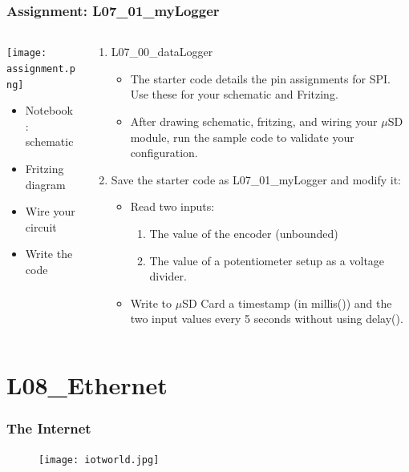 \documentclass{beamer}
\begin{document}
\begin{frame}\frametitle{Assignment: L07\_01\_myLogger}
\begin{columns}
\begin{column}{4cm}
\texttt{[image: assignment.png]}
\begin{itemize}
\item Notebook: schematic
\item Fritzing diagram
\item Wire your circuit
\item Write the code
\end{itemize}
\end{column}

\begin{column}{8cm}
\begin{enumerate}
\item L07\_00\_dataLogger
	\begin{itemize}
	\item The starter code details the pin assignments for SPI. Use these for your schematic and Fritzing.
	\item After drawing schematic, fritzing, and wiring your $\mu$SD module, run the sample code to validate your configuration.
	\end{itemize}
\item Save the starter code as L07\_01\_myLogger and modify it:
	\begin{itemize}
		\item Read two inputs:
		\begin{enumerate}
		\item The value of the encoder (unbounded)
		\item The value of a potentiometer setup as a voltage divider.
		\end{enumerate}
		\item Write to $\mu$SD Card a timestamp (in millis()) and the two input values every 5 seconds without using delay().
	\end{itemize}
\end{enumerate}
\end{column}
\end{columns}
\end{frame}

\section{L08\_Ethernet}
\begin{frame}\frametitle{The Internet}
\begin{figure}[h]
	\texttt{[image: iotworld.jpg]}
\end{figure}
\end{frame}
\end{document}
